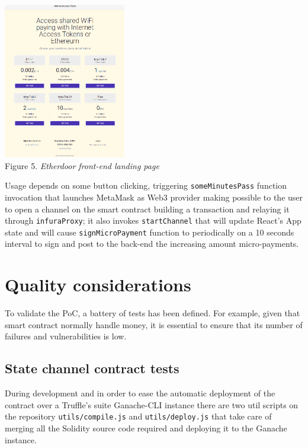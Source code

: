\documentclass[12pt]{amsart}
\begin{document}
\begin{multicols}{2}
\begin{center}
  \includegraphics[keepaspectratio, width=0.4\textwidth]{images/portal-y.eps}
  \\
  Figure 5. \textit{Etherdoor front-end landing page}
\end{center}

Usage depends on some button clicking, triggering
\texttt{someMinutesPass} function invocation that launches MetaMask
as Web3 provider making possible to the user to open a channel
on the smart contract building a transaction and relaying it
through \texttt{infuraProxy}; it also invokes \texttt{startChannel}
that will update React's App state and will cause
\texttt{signMicroPayment} function to periodically on a 10 seconds
interval to sign and post to the back-end the increasing amount
micro-payments.

\section{Quality considerations}\label{sec:proofs}

\vspace{0.35cm}

To validate the PoC, a battery of tests has
been defined. For example, given
that smart contract normally handle money,
it is essential to ensure that
its number of failures and vulnerabilities is low\cite{Hegedus18}.

\subsection{State channel contract tests}

\vspace{0.35cm}

During development and in order to ease
the automatic deployment of the contract
over a Truffle's suite Ganache-CLI\cite{ganache}
instance there are two util scripts on the
repository\cite{state-channel-contract-a}
\texttt{utils/compile.js} and \texttt{utils/deploy.js}
that take care of merging all the Solidity source
code required and deploying it to the Ganache instance.


\end{multicols}
\end{document}
